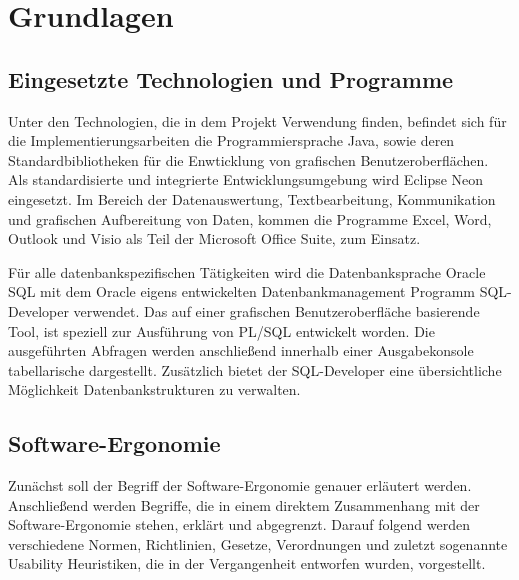\section{Grundlagen}


\subsection{Eingesetzte Technologien und Programme}
Unter den Technologien, die in dem Projekt Verwendung finden, befindet sich für die Implementierungsarbeiten die Programmiersprache Java, sowie deren Standardbibliotheken für die Enwticklung von grafischen Benutzeroberflächen. Als standardisierte und integrierte Entwicklungsumgebung wird Eclipse Neon eingesetzt. Im Bereich der Datenauswertung, Textbearbeitung, Kommunikation und grafischen Aufbereitung von Daten, kommen die Programme Excel, Word, Outlook und Visio als Teil der Microsoft Office Suite, zum Einsatz. 

Für alle datenbankspezifischen Tätigkeiten wird die Datenbanksprache Oracle SQL mit dem Oracle eigens entwickelten Datenbankmanagement Programm SQL-Developer verwendet. Das auf einer grafischen Benutzeroberfläche basierende Tool, ist speziell zur Ausführung von PL/SQL entwickelt worden. Die ausgeführten Abfragen werden anschließend innerhalb einer Ausgabekonsole tabellarische dargestellt. Zusätzlich bietet der SQL-Developer eine übersichtliche Möglichkeit Datenbankstrukturen zu verwalten. 


\subsection{Software-Ergonomie}
Zunächst soll der Begriff der Software-Ergonomie genauer erläutert werden. Anschließend werden Begriffe, die in einem direktem Zusammenhang mit der Software-Ergonomie stehen, erklärt und abgegrenzt. Darauf folgend werden verschiedene Normen, Richtlinien, Gesetze, Verordnungen und zuletzt sogenannte Usability Heuristiken, die in der Vergangenheit entworfen wurden, vorgestellt.


